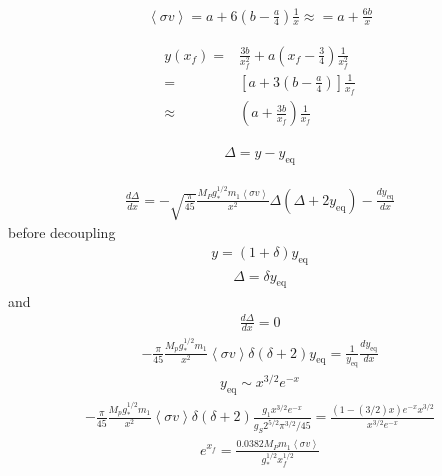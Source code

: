 \documentclass[12pt,letterpaper]{article}
\begin{document}
\begin{align*}
  \left\langle \sigma v \right\rangle
=a+6 \left( b-\frac{a}{4} \right)\frac{1}{x}\approx=a+\frac{6b}{x}
\end{align*}

\begin{align*}
  y(x_f)=&\frac{3b}{x_f^2}+a \left(x_f-\frac{3}{4}  \right)\frac{1}{x_f^2}\\
=&\left[ a+3 \left( b-\frac{a}{4} \right) \right]\frac{1}{x_f}\\
\approx & \left( a+\frac{3b}{x_f} \right)\frac{1}{x_f}
\end{align*}

\begin{align*}
  \Delta=y-y_{\text{eq}}
\end{align*}

\begin{align*}
  \frac{d\Delta}{dx}=-\sqrt{\frac{\pi}{45}}\frac{M_P g_{*}^{1/2}m_1 \left\langle \sigma v \right\rangle}{x^2}
\Delta \left( \Delta +2y_{\text{eq}} \right)-\frac{dy_{\text{eq}}}{dx}
\end{align*}
before decoupling
\begin{align*}
  y=(1+\delta)y_{\text{eq}}
\end{align*}
\begin{align*}
  \Delta=\delta y_{\text{eq}} 
\end{align*}
and
\begin{align*}
  \frac{d\Delta}{dx}=0
\end{align*}
\begin{align*}
  -\frac{\pi}{45} \frac{M_p g_{*}^{1/2}m_1}{x^2}\left\langle \sigma v \right\rangle \delta(\delta+2)y_{\text{eq}}
=\frac{1}{y_{\text{eq}}}\frac{d y_{\text{eq}}}{dx}
\end{align*}
\begin{align*}
  y_{\text{eq}}\sim x^{3/2}e^{-x}
\end{align*}
\begin{align*}
  -\frac{\pi}{45} \frac{M_p g_{*}^{1/2}m_1}{x^2}\left\langle \sigma v \right\rangle \delta(\delta+2)
\frac{g_1 x^{3/2} e^{-x}}{g_S 2^{5/2}\pi^{3/2}/45}=
\frac{(1-(3/2)x)e^{-x}x^{3/2}}{x^{3/2}e^{-x}}
\end{align*}
\begin{align*}
  e^{x_f}=\frac{0.0382 M_P m_1 \left\langle \sigma v \right\rangle}{g_{*}^{1/2}x_f^{1/2}}
\end{align*}
\end{document}
